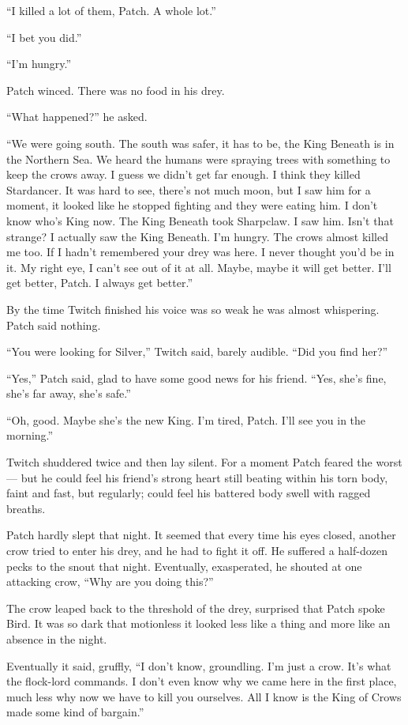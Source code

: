 \documentclass[ebook,oneside,openany,12pt]{memoir}
\begin{document}
“I killed a lot of them, Patch. A whole lot.”

“I bet you did.”

“I’m hungry.”

Patch winced. There was no food in his drey.

“What happened?” he asked.

“We were going south. The south was safer, it has to be, the King
Beneath is in the Northern Sea. We heard the humans were spraying
trees with something to keep the crows away. I guess we didn’t get far
enough. I think they killed Stardancer. It was hard to see, there’s
not much moon, but I saw him for a moment, it looked like he stopped
fighting and they were eating him. I don’t know who’s King now. The
King Beneath took Sharpclaw. I saw him. Isn’t that strange? I actually
saw the King Beneath. I’m hungry. The crows almost killed me too. If I
hadn’t remembered your drey was here. I never thought you’d be in
it. My right eye, I can’t see out of it at all. Maybe, maybe it will
get better. I’ll get better, Patch. I always get better.”

By the time Twitch finished his voice was so weak he was almost
whispering. Patch said nothing.

“You were looking for Silver,” Twitch said, barely audible. “Did you
find her?”

“Yes,” Patch said, glad to have some good news for his friend. “Yes,
she’s fine, she’s far away, she’s safe.”

“Oh, good. Maybe she’s the new King. I’m tired, Patch. I’ll see you in
the morning.”

Twitch shuddered twice and then lay silent. For a moment Patch feared
the worst — but he could feel his friend’s strong heart still beating
within his torn body, faint and fast, but regularly; could feel his
battered body swell with ragged breaths.

Patch hardly slept that night. It seemed that every time his eyes
closed, another crow tried to enter his drey, and he had to fight it
off. He suffered a half-dozen pecks to the snout that
night. Eventually, exasperated, he shouted at one attacking crow, “Why
are you doing this?”

The crow leaped back to the threshold of the drey, surprised that
Patch spoke Bird. It was so dark that motionless it looked less like a
thing and more like an absence in the night.

Eventually it said, gruffly, “I don’t know, groundling. I’m just a
crow. It’s what the flock-lord commands. I don’t even know why we came
here in the first place, much less why now we have to kill you
ourselves. All I know is the King of Crows made some kind of bargain.”
\end{document}
